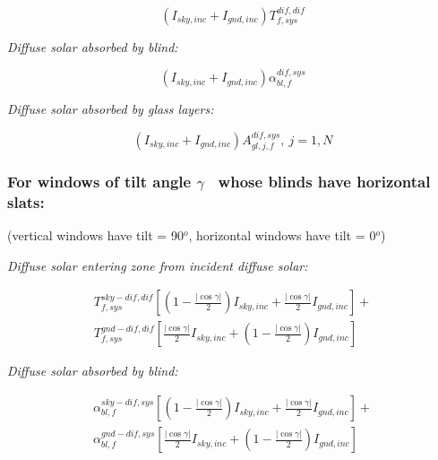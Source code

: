 \begin{equation}
({I_{sky,inc}} + {I_{gnd,inc}})T_{f,sys}^{dif,dif}
\end{equation}

\emph{Diffuse solar absorbed by blind:}

\begin{equation}
({I_{sky,inc}} + {I_{gnd,inc}})\alpha_{bl,f}^{dif,sys}
\end{equation}

\emph{Diffuse solar absorbed by glass layers:}

\begin{equation}
({I_{sky,inc}} + {I_{gnd,inc}})A_{gl,j,f}^{dif,sys},{\mathrm{   }}~j = 1,N{\mathrm{ }}
\end{equation}

\subsubsection{For windows of tilt angle \(\gamma\) ~whose blinds have horizontal slats:}\label{for-windows-of-tilt-angle-gamma-whose-blinds-have-horizontal-slats}

(vertical windows have tilt = 90\(^{o}\), horizontal windows have tilt = 0\(^{o}\))

\emph{Diffuse solar entering zone from incident diffuse solar:}

\begin{equation}
\begin{split}
T_{f,sys}^{sky - dif,dif}\left[ {\left( {1 - \frac{{|\cos \gamma |}}{2}} \right){I_{sky,inc}} + \frac{{|\cos \gamma |}}{2}{I_{gnd,inc}}} \right] + \\
T_{f,sys}^{gnd - dif,dif}\left[ {\frac{{|\cos \gamma |}}{2}{I_{sky,inc}} + \left( {1 - \frac{{|\cos \gamma |}}{2}} \right){I_{gnd,inc}}} \right]
\end{split}
\end{equation}

\emph{Diffuse solar absorbed by blind:}

\begin{equation}
\begin{split}
\alpha_{bl,f}^{sky - dif,sys}\left[ {\left( {1 - \frac{{|\cos \gamma |}}{2}} \right){I_{sky,inc}} + \frac{{|\cos \gamma |}}{2}{I_{gnd,inc}}} \right] + \\
\alpha_{bl,f}^{gnd - dif,sys}\left[ {\frac{{|\cos \gamma |}}{2}{I_{sky,inc}} + \left( {1 - \frac{{|\cos \gamma |}}{2}} \right){I_{gnd,inc}}} \right]
\end{split}
\end{equation}

